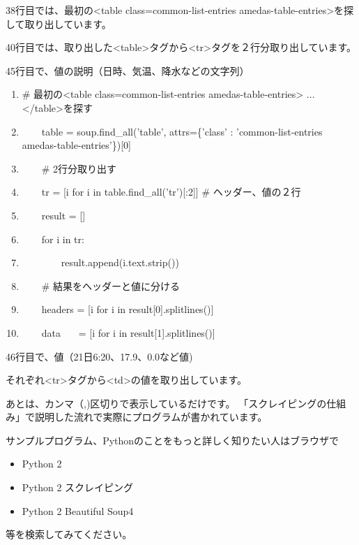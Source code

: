 \documentclass[a4paper,12pt,dvipdfmx]{jarticle}
\begin{document}
38行目では、最初の{\textless}table class={\textquotedbl}common-list-entries
amedas-table-entries{\textquotedbl}{\textgreater}を探して取り出しています。

40行目では、取り出した{\textless}table{\textgreater}タグから{\textless}tr{\textgreater}タグを２行分取り出しています。

45行目で、値の説明（日時、気温、降水などの文字列）

\begin{center}
\begin{boxedminipage}{17.658cm}
\begin{enumerate}
\setlength{\itemsep}{0cm} %
\baselineskip 10pt
\setcounter{enumi}{36}
\item \# 最初の{\textless}table class={\textquotedbl}common-list-entries
amedas-table-entries{\textquotedbl}{\textgreater} ... {\textless}/table{\textgreater}を探す
\item \ \ \ \ table = soup.find\_all('table', attrs=\{'class' : 'common-list-entries amedas-table-entries'\})[0] 
\item \ \ \ \ \# 2行分取り出す
\item \ \ \ \ tr = [i for i in table.find\_all('tr')[:2]] \#
ヘッダー、値の２行
\item \ \ \ \ result = []
\item \ \ \ \ for i in tr:
\item \ \ \ \ \ \ \ \ result.append(i.text.strip())
\item \ \ \ \ \# 結果をヘッダーと値に分ける
\item \ \ \ \ headers = [i for i in result[0].splitlines()]
\item \ \ \ \ data \ \ \ = [i for i in result[1].splitlines()]
\end{enumerate}
\end{boxedminipage}
\end{center}
46行目で、値（21日6:20、17.9、0.0など値)

それぞれ{\textless}tr{\textgreater}タグから{\textless}td{\textgreater}の値を取り出しています。


あとは、カンマ（,)区切りで表示しているだけです。
「スクレイピングの仕組み」で説明した流れで実際にプログラムが書かれています。



\bigskip


\bigskip

サンプルプログラム、Pythonのことをもっと詳しく知りたい人はブラウザで

\begin{itemize}
\item Python 2
\item Python 2 スクレイピング
\item Python 2 Beautiful Soup4
\end{itemize}
等を検索してみてください。
\end{document}
